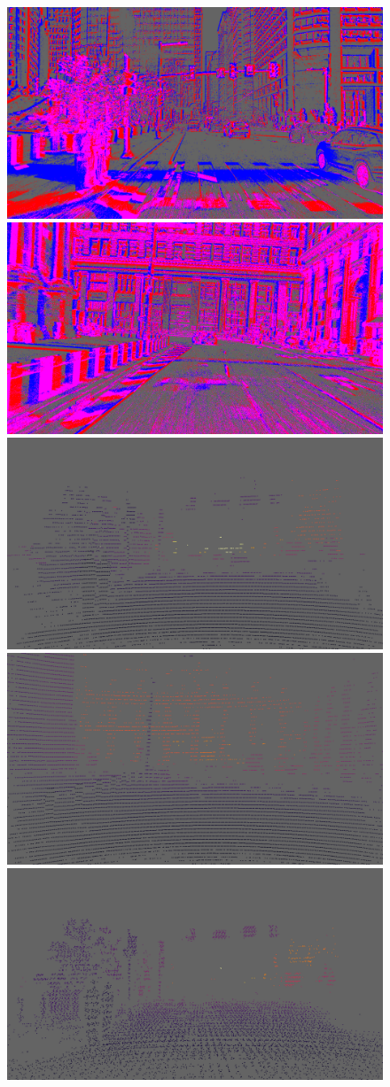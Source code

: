 \begin{figure}
  \centering
  \includegraphics[width=0.4325\linewidth]{mainmatter/figures/c_depth_transf/m3ed_dense_cmp_additional/evts000164_lightgray_fixed.png}
  \includegraphics[width=0.4325\linewidth]{mainmatter/figures/c_depth_transf/m3ed_dense_cmp_additional/evts001921_lightgray_fixed.png}\\
  \includegraphics[width=0.4325\linewidth]{mainmatter/figures/c_depth_transf/m3ed_dense_cmp_additional/lidar000164_lightgray_fixed.png}
  \includegraphics[width=0.4325\linewidth]{mainmatter/figures/c_depth_transf/m3ed_dense_cmp_additional/lidar001921_lightgray_fixed.png}\\
  \includegraphics[width=0.4325\linewidth]{mainmatter/figures/c_depth_transf/m3ed_dense_cmp_additional/gtbf000164_lightgray_fixed.png}

\end{figure}
